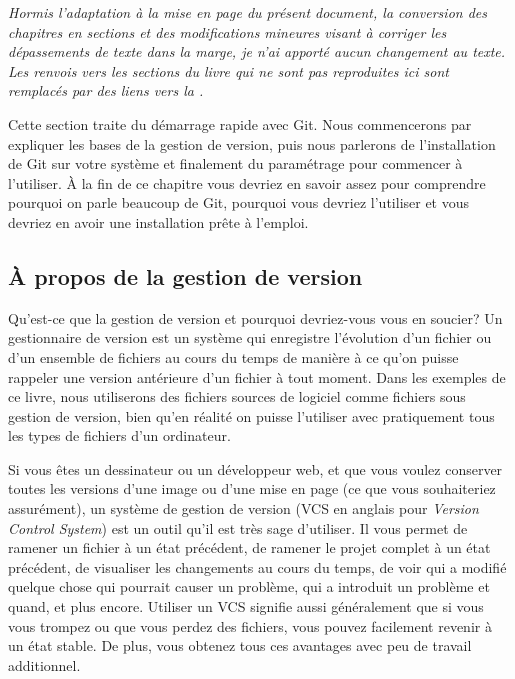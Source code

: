 {%
  \itshape\noindent%
  Hormis l'adaptation à la mise en page du présent document, la
  conversion des chapitres en sections et des modifications mineures
  visant à corriger les dépassements de texte dans la marge, je n'ai
  apporté aucun changement au texte. Les renvois vers les sections du
  livre qui ne sont pas reproduites ici sont remplacés par des liens
  vers la .
}
\medskip

\begingroup
{}
\raggedbottom

Cette section traite du démarrage rapide avec Git.
Nous commencerons par expliquer les bases de la gestion de version, puis nous parlerons de l'installation de Git sur votre système et finalement du paramétrage pour commencer à l'utiliser.
À la fin de ce chapitre vous devriez en savoir assez pour comprendre pourquoi on parle beaucoup de Git, pourquoi vous devriez l'utiliser et vous devriez en avoir une installation prête à l'emploi.

\subsection{À propos de la gestion de version}

Qu'est-ce que la gestion de version et pourquoi devriez-vous vous en soucier?
Un gestionnaire de version est un système qui enregistre l'évolution d'un fichier ou d'un ensemble de fichiers au cours du temps de manière à ce qu'on puisse rappeler une version antérieure d'un fichier à tout moment.
Dans les exemples de ce livre, nous utiliserons des fichiers sources de logiciel comme fichiers sous gestion de version, bien qu'en réalité on puisse l'utiliser avec pratiquement tous les types de fichiers d'un ordinateur.

Si vous êtes un dessinateur ou un développeur web, et que vous voulez conserver toutes les versions d'une image ou d'une mise en page (ce que vous souhaiteriez assurément), un système de gestion de version (VCS en anglais pour \emph{Version Control System}) est un outil qu'il est très sage d'utiliser.
Il vous permet de ramener un fichier à un état précédent, de ramener le projet complet à un état précédent, de visualiser les changements au cours du temps, de voir qui a modifié quelque chose qui pourrait causer un problème, qui a introduit un problème et quand, et plus encore.
Utiliser un VCS signifie aussi généralement que si vous vous trompez ou que vous perdez des fichiers, vous pouvez facilement revenir à un état stable.
De plus, vous obtenez tous ces avantages avec peu de travail additionnel.


